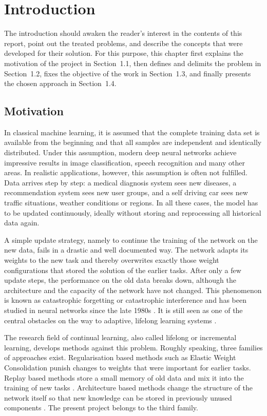 \chapter{Introduction}
\label{chap:introduction}

The introduction should awaken the reader's interest in the contents of
this report, point out the treated problems, and describe the concepts that
were developed for their solution. For this purpose, this chapter first
explains the motivation of the project in Section~1.1, then defines and
delimits the problem in Section~1.2, fixes the objective of the work in
Section~1.3, and finally presents the chosen approach in Section~1.4.

\section{Motivation}
\label{sec:motivation}

In classical machine learning, it is assumed that the complete training
data set is available from the beginning and that all samples are
independent and identically distributed. Under this assumption, modern deep
neural networks achieve impressive results in image classification, speech
recognition and many other areas. In realistic applications, however, this
assumption is often not fulfilled. Data arrives step by step: a medical
diagnosis system sees new diseases, a recommendation system sees new user
groups, and a self driving car sees new traffic situations, weather
conditions or regions. In all these cases, the model has to be updated
continuously, ideally without storing and reprocessing all historical data
again.

A simple update strategy, namely to continue the training of the network on
the new data, fails in a drastic and well documented way. The network
adapts its weights to the new task and thereby overwrites exactly those
weight configurations that stored the solution of the earlier tasks. After
only a few update steps, the performance on the old data breaks down,
although the architecture and the capacity of the network have not changed.
This phenomenon is known as catastrophic forgetting or catastrophic
interference and has been studied in neural networks since the late 1980s
\cite{mccloskey1989,french1999}. It is still seen as one of the central
obstacles on the way to adaptive, lifelong learning systems
\cite{delange2021,wang2024survey}.

The research field of continual learning, also called lifelong or
incremental learning, develops methods against this problem. Roughly
speaking, three families of approaches exist. Regularisation based methods
such as Elastic Weight Consolidation \cite{kirkpatrick2017} punish changes
to weights that were important for earlier tasks. Replay based methods
store a small memory of old data and mix it into the training of new tasks
\cite{rebuffi2017,lopezpaz2017}. Architecture based methods change the
structure of the network itself so that new knowledge can be stored in
previously unused components \cite{rusu2016}. The present project belongs
to the third family.

